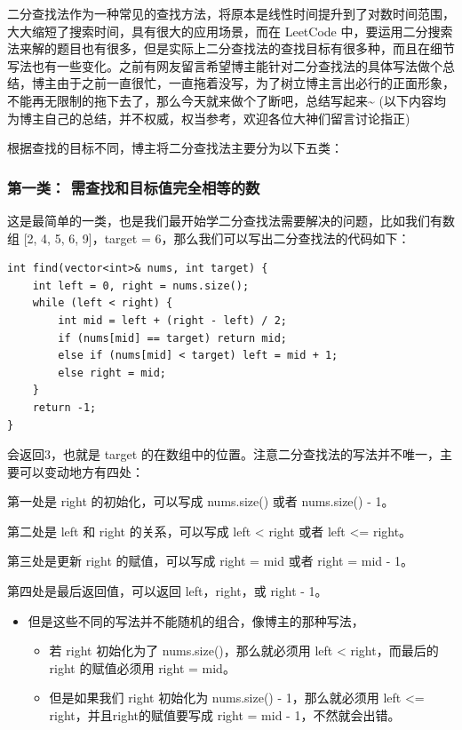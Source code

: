 \documentclass[9pt, b5paper]{article}
\begin{document}
二分查找法作为一种常见的查找方法，将原本是线性时间提升到了对数时间范围，大大缩短了搜索时间，具有很大的应用场景，而在 LeetCode 中，要运用二分搜索法来解的题目也有很多，但是实际上二分查找法的查找目标有很多种，而且在细节写法也有一些变化。之前有网友留言希望博主能针对二分查找法的具体写法做个总结，博主由于之前一直很忙，一直拖着没写，为了树立博主言出必行的正面形象，不能再无限制的拖下去了，那么今天就来做个了断吧，总结写起来\textasciitilde{} (以下内容均为博主自己的总结，并不权威，权当参考，欢迎各位大神们留言讨论指正)

根据查找的目标不同，博主将二分查找法主要分为以下五类：

\subsubsection{第一类： 需查找和目标值完全相等的数}
\label{sec-14-1-1}

这是最简单的一类，也是我们最开始学二分查找法需要解决的问题，比如我们有数组 [2, 4, 5, 6, 9]，target = 6，那么我们可以写出二分查找法的代码如下：
\begin{verbatim}
int find(vector<int>& nums, int target) {
    int left = 0, right = nums.size();
    while (left < right) {
        int mid = left + (right - left) / 2;
        if (nums[mid] == target) return mid;
        else if (nums[mid] < target) left = mid + 1;
        else right = mid;
    }
    return -1;
}
\end{verbatim}

会返回3，也就是 target 的在数组中的位置。注意二分查找法的写法并不唯一，主要可以变动地方有四处：

第一处是 right 的初始化，可以写成 nums.size() 或者 nums.size() - 1。

第二处是 left 和 right 的关系，可以写成 left < right 或者 left <= right。

第三处是更新 right 的赋值，可以写成 right = mid 或者 right = mid - 1。

第四处是最后返回值，可以返回 left，right，或 right - 1。

\begin{itemize}
\item 但是这些不同的写法并不能随机的组合，像博主的那种写法，
\begin{itemize}
\item 若 right 初始化为了 nums.size()，那么就必须用 left < right，而最后的 right 的赋值必须用 right = mid。
\item 但是如果我们 right 初始化为 nums.size() - 1，那么就必须用 left <= right，并且right的赋值要写成 right = mid - 1，不然就会出错。
\end{itemize}
\end{itemize}
\end{document}
